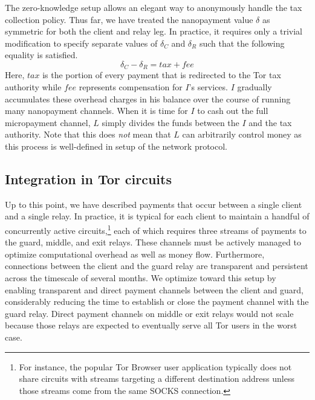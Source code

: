 The zero-knowledge setup allows an elegant way to anonymously handle the tax
collection policy. Thus far, we have treated the nanopayment value $\delta$ as
symmetric for both the client and relay leg. In practice, it requires only a
trivial modification to specify separate values of $\delta_C$ and $\delta_R$
such that the following equality is satisfied.
\begin{equation}
  \delta_C - \delta_R = tax + fee
  \label{eq:payment}
\end{equation}
Here, $tax$ is the portion of every payment that is redirected to the Tor tax
authority while $fee$ represents compensation for $I$'s services. $I$ gradually
accumulates these overhead charges in his balance over the course of running
many nanopayment channels. When it is time for $I$ to cash out the full
micropayment channel, $L$ simply divides the funds between the $I$ and the tax
authority. Note that this does \emph{not} mean that $L$ can arbitrarily control
money as this process is well-defined in setup of the network protocol.

\subsection{Integration in Tor circuits}
Up to this point, we have described payments that occur between a single client
and a single relay. In practice, it is typical for each client to maintain a
handful of concurrently active circuits,\footnote{For instance, the popular Tor
  Browser user application typically does not share circuits with streams
  targeting a different destination address unless those streams come from the
  same SOCKS connection.} each of which requires three streams of payments to
the guard, middle, and exit relays. These channels must be actively managed to
optimize computational overhead as well as money flow. Furthermore, connections
between the client and the guard relay are transparent and persistent across the
timescale of several months. We optimize toward this setup by enabling
transparent and direct payment channels between the client and guard,
considerably reducing the time to establish or close the payment channel with
the guard relay. Direct payment channels on middle or exit relays would not
scale because those relays are expected to eventually serve all Tor users in the
worst case.



